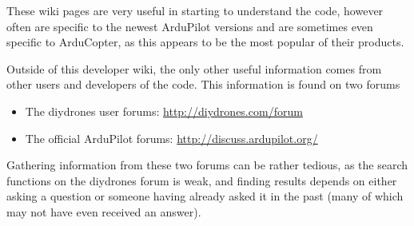 These wiki pages are very useful in starting to understand the code, however often are specific to the newest ArduPilot versions and are sometimes even specific to ArduCopter, as this appears to be the most popular of their products. 

Outside of this developer wiki, the only other useful information comes from other users and developers of the code. This information is found on two forums

\begin{itemize}
	\item The diydrones user forums: \url{http://diydrones.com/forum}
	\item The official ArduPilot forums: \url{http://discuss.ardupilot.org/}
\end{itemize}

Gathering information from these two forums can be rather tedious, as the search functions on the diydrones forum is weak, and finding results depends on either asking a question or someone having already asked it in the past (many of which may not have even received an answer). 




